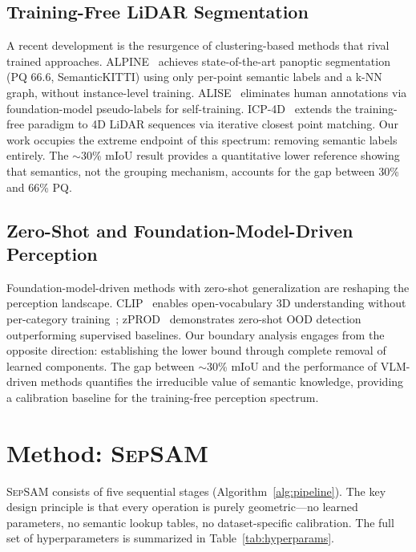 \documentclass{article}
\begin{document}
\subsection{Training-Free LiDAR Segmentation}

A recent development is the resurgence of clustering-based methods that rival
trained approaches. ALPINE~\cite{sautier2025alpine} achieves state-of-the-art
panoptic segmentation (PQ 66.6, SemanticKITTI) using only per-point semantic
labels and a k-NN graph, without instance-level training.
ALISE~\cite{lyu2025alise} eliminates human annotations via foundation-model
pseudo-labels for self-training. ICP-4D~\cite{oh2025trainingfree} extends the
training-free paradigm to 4D LiDAR sequences via iterative closest point matching.
Our work occupies the extreme endpoint of this spectrum: removing semantic labels
entirely. The $\sim$30\% mIoU result provides a quantitative lower reference
showing that semantics, not the grouping mechanism, accounts for the gap between
30\% and 66\% PQ.

\subsection{Zero-Shot and Foundation-Model-Driven Perception}

Foundation-model-driven methods with zero-shot generalization are reshaping the
perception landscape. CLIP~\cite{radford2021learning} enables open-vocabulary 3D
understanding without per-category training~\cite{cheng2024open3dworld};
zPROD~\cite{sinhamahapatra2025zprod} demonstrates zero-shot OOD detection
outperforming supervised baselines. Our boundary analysis engages from the
opposite direction: establishing the lower bound through complete removal of
learned components. The gap between $\sim$30\% mIoU and the performance of
VLM-driven methods quantifies the irreducible value of semantic knowledge,
providing a calibration baseline for the training-free perception spectrum.

\section{Method: \textsc{SepSAM}}

\textsc{SepSAM} consists of five sequential stages (Algorithm~\ref{alg:pipeline}). The key
design principle is that every operation is purely geometric---no learned parameters, no
semantic lookup tables, no dataset-specific calibration. The full set of hyperparameters is summarized in
Table~\ref{tab:hyperparams}.
\end{document}
